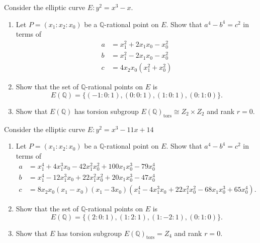 \documentclass[12 pt, letterpaper]{hmcpset}
\begin{document}
\begin{problem}[Problem 1.]
	Consider the elliptic curve $E : y^{2} = x^{3} - x$.
	\begin{enumerate}
		\item Let $P = (x_{1} : x_{2} : x_{0})$ be a $\mathbb{Q}$-rational point on $E$. Show that $a^{4} - b^{4} = c^{2}$ in terms of
			\[
				\begin{split}
					a & = x_{1}^{2} + 2 x_{1} x_{0} - x_{0}^{2} \\
					b & = x_{1}^{2} - 2 x_{1} x_{0} - x_{0}^{2} \\
					c & = 4 x_{2} x_{0} (x_{1}^{2} + x_{0}^{2})
				\end{split}
			\]
		\item Show that the set of $\mathbb{Q}$-rational points on $E$ is
			\[
				E(\mathbb{Q}) = \{ (-1 : 0 : 1), (0 : 0 : 1), (1 : 0 : 1), (0 : 1 : 0) \}.
			\]
		\item Show that  $E(\mathbb{Q})$ has torsion subgroup $E(\mathbb{Q})_{\text{tors}} \cong Z_{2} \times Z_{2}$ and rank $r = 0$.
	\end{enumerate}
\end{problem}

\pagebreak

\begin{problem}[Problem 2.]
	Consider the elliptic curve $E : y^{2} = x^{3} - 11 x + 14$
	\begin{enumerate}
		\item Let $P = (x_{1} : x_{2} : x_{0})$ be a $\mathbb{Q}$-rational point on $E$. Show that $a^{4} - b^{4} = c^{2}$ in terms of
			\[
				\begin{split}
					a & = x_{1}^{4} + 4 x_{1}^{3} x_{0} - 42 x_{1}^{2} x_{0}^{2} + 100 x_{1} x_{0}^{3} - 79 x_{0}^{4} \\
					b & = x_{1}^{4} - 12 x_{1}^{3} x_{0} + 22 x_{1}^{2} x_{0}^{2} + 20 x_{1} x_{0}^{3} - 47 x_{0}^{4} \\
					c & = 8 x_{2} x_{0} (x_{1} - x_{0})(x_{1} - 3 x_{0})(x_{1}^{4} - 4 x_{1}^{3} x_{0} + 22 x_{1}^{2} x_{0}^{2} - 68 x_{1} x_{0}^{3} + 65 x_{0}^{4}).
				\end{split}
			\]
		\item Show that the set of $\mathbb{Q}$-rational points on $E$ is
			\[
				E(\mathbb{Q}) = \{ (2 : 0 : 1), (1 : 2 : 1), (1 : -2 : 1), (0 : 1 : 0) \}.
			\]
		\item Show that $E$ has torsion subgroup $E(\mathbb{Q})_{\text{tors}} = Z_{4}$ and rank $r = 0$.
	\end{enumerate}
\end{problem}
\end{document}
